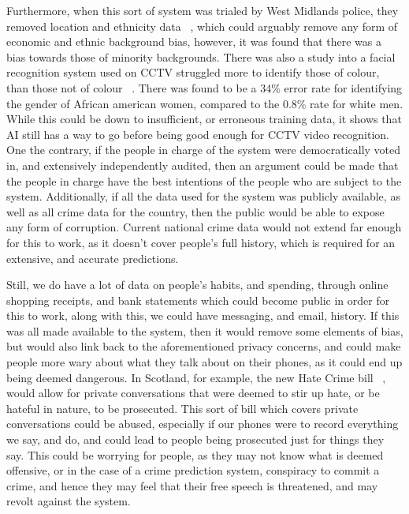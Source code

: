 Furthermore, when this sort of system was trialed by West Midlands police, they removed location and ethnicity data
~\cite{wmp-trial}, which could arguably remove any form of economic and ethnic background bias, however, it was
found that there was a bias towards those of minority backgrounds.
There was also a study into a facial recognition system used on CCTV struggled more to identify those of colour,
than those not of colour ~\cite{ifsec-bias-article}.
There was found to be a 34\% error rate for identifying the gender of African american women, compared to the
0.8\% rate for white men.
While this could be down to insufficient, or erroneous training data, it shows that AI still has a way to go before
being good enough for CCTV video recognition.
\\

One the contrary, if the people in charge of the system were democratically voted in, and extensively independently
audited, then an argument could be made that the people in charge have the best intentions of the people who are
subject to the system.
Additionally, if all the data used for the system was publicly available, as well as all crime data for the
country, then the public would be able to expose any form of corruption.
Current national crime data would not extend far enough for this to work, as it doesn't cover people's full history, which is
required for an extensive, and accurate predictions.

Still, we do have a lot of data on people's habits, and spending, through online shopping receipts, and bank statements
which could become public in order for this to work, along with this, we could have messaging, and email, history.
If this was all made available to the system, then it would remove some elements of bias, but would also link back to
the aforementioned privacy concerns, and could make people more wary about what they talk about on their phones, as
it could end up being deemed dangerous.
In Scotland, for example, the new Hate Crime bill  ~\cite{hate-crime-bill}, would allow for private conversations that
were deemed to stir up hate, or be hateful in nature, to be prosecuted.
This sort of bill which covers private conversations could be abused, especially if our phones were to record
everything we say, and do, and could lead to people being prosecuted just for things they say.
This could be worrying for people, as they may not know what is deemed offensive, or in the case of a crime prediction
system, conspiracy to commit a crime, and hence they may feel that their free speech is threatened, and may revolt
against the system.